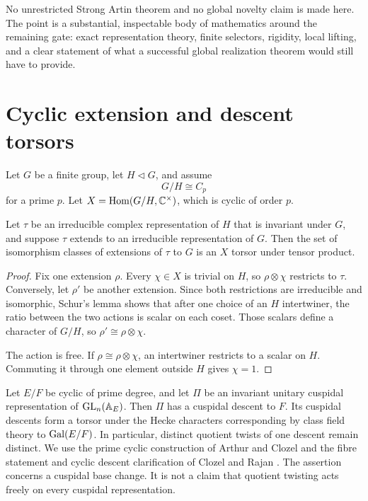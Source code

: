 No unrestricted Strong Artin theorem and no global novelty claim is made here. The point is a substantial, inspectable body of mathematics around the remaining gate: exact representation theory, finite selectors, rigidity, local lifting, and a clear statement of what a successful global realization theorem would still have to provide.

\section{Cyclic extension and descent torsors}\label{sec:torsors}

Let \(G\) be a finite group, let \(H\triangleleft G\), and assume
\[
 G/H\cong C_p
\]
for a prime \(p\). Let \(X=\operatorname{Hom}(G/H,\mathbb C^\times)\), which is cyclic of order \(p\).

\begin{proposition}\label{prop:galois_torsor}
Let \(\tau\) be an irreducible complex representation of \(H\) that is invariant under \(G\), and suppose \(\tau\) extends to an irreducible representation of \(G\). Then the set of isomorphism classes of extensions of \(\tau\) to \(G\) is an \(X\) torsor under tensor product.
\end{proposition}

\begin{proof}
Fix one extension \(\rho\). Every \(\chi\in X\) is trivial on \(H\), so \(\rho\otimes\chi\) restricts to \(\tau\). Conversely, let \(\rho'\) be another extension. Since both restrictions are irreducible and isomorphic, Schur's lemma shows that after one choice of an \(H\) intertwiner, the ratio between the two actions is scalar on each coset. Those scalars define a character of \(G/H\), so \(\rho'\cong\rho\otimes\chi\).

The action is free. If \(\rho\cong\rho\otimes\chi\), an intertwiner restricts to a scalar on \(H\). Commuting it through one element outside \(H\) gives \(\chi=1\).
\end{proof}

\begin{standardfact}\label{fact:base_change_fibre}
Let \(E/F\) be cyclic of prime degree, and let \(\Pi\) be an invariant unitary cuspidal representation of \(\operatorname{GL}_n(\mathbb A_E)\). Then \(\Pi\) has a cuspidal descent to \(F\). Its cuspidal descents form a torsor under the Hecke characters corresponding by class field theory to \(\operatorname{Gal}(E/F)\). In particular, distinct quotient twists of one descent remain distinct. We use the prime cyclic construction of Arthur and Clozel and the fibre statement and cyclic descent clarification of Clozel and Rajan \cite{ArthurClozel1989,ClozelRajan2020}. The assertion concerns a cuspidal base change. It is not a claim that quotient twisting acts freely on every cuspidal representation.
\end{standardfact}

